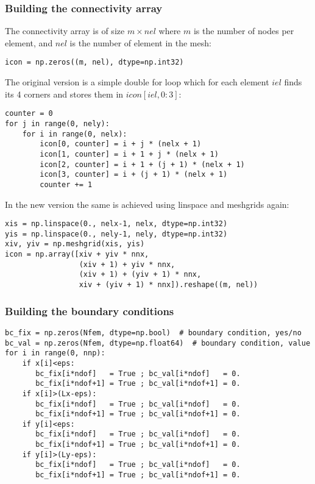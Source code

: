 \subsubsection*{Building the connectivity array}

The connectivity array is of size $m \times nel$ 
where $m$ is the number of nodes per element, and $nel$ is the number 
of element in the mesh: 

\begin{lstlisting}
icon = np.zeros((m, nel), dtype=np.int32)
\end{lstlisting}

The original version is a simple double for loop
which for each element $iel$ finds its 4 corners and 
stores them in $icon[iel,0:3]$:

\begin{lstlisting}
counter = 0
for j in range(0, nely):
    for i in range(0, nelx):
        icon[0, counter] = i + j * (nelx + 1)
        icon[1, counter] = i + 1 + j * (nelx + 1)
        icon[2, counter] = i + 1 + (j + 1) * (nelx + 1)
        icon[3, counter] = i + (j + 1) * (nelx + 1)
        counter += 1
\end{lstlisting}

In the new version the same is achieved
using linspace and meshgrids again:

\begin{lstlisting}
xis = np.linspace(0., nelx-1, nelx, dtype=np.int32)
yis = np.linspace(0., nely-1, nely, dtype=np.int32)
xiv, yiv = np.meshgrid(xis, yis)
icon = np.array([xiv + yiv * nnx,
                 (xiv + 1) + yiv * nnx,
                 (xiv + 1) + (yiv + 1) * nnx,
                 xiv + (yiv + 1) * nnx]).reshape((m, nel))
\end{lstlisting}


\subsubsection*{Building the boundary conditions} 


\begin{lstlisting}
bc_fix = np.zeros(Nfem, dtype=np.bool)  # boundary condition, yes/no
bc_val = np.zeros(Nfem, dtype=np.float64)  # boundary condition, value
for i in range(0, nnp):
    if x[i]<eps:
       bc_fix[i*ndof]   = True ; bc_val[i*ndof]   = 0.
       bc_fix[i*ndof+1] = True ; bc_val[i*ndof+1] = 0.
    if x[i]>(Lx-eps):
       bc_fix[i*ndof]   = True ; bc_val[i*ndof]   = 0.
       bc_fix[i*ndof+1] = True ; bc_val[i*ndof+1] = 0.
    if y[i]<eps:
       bc_fix[i*ndof]   = True ; bc_val[i*ndof]   = 0.
       bc_fix[i*ndof+1] = True ; bc_val[i*ndof+1] = 0.
    if y[i]>(Ly-eps):
       bc_fix[i*ndof]   = True ; bc_val[i*ndof]   = 0.
       bc_fix[i*ndof+1] = True ; bc_val[i*ndof+1] = 0.
\end{lstlisting}



